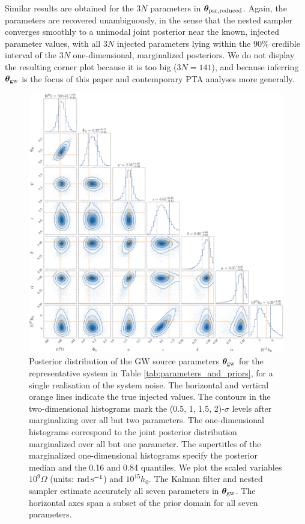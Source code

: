 \documentclass[fleqn,usenatbib,useAMS]{mnras}
\begin{document}
Similar results are obtained for the 3$N$ parameters in $\boldsymbol{\theta}_{\rm psr, reduced}$. Again, the parameters are recovered unambiguously, in the sense that the nested sampler converges smoothly to a unimodal joint posterior near the known, injected parameter values, with all $3N$ injected parameters lying within the 90\% credible interval of the $3N$ one-dimensional, marginalized posteriors. We do not display the resulting corner plot because it is too big ($3N = 141$), and because inferring ${\boldsymbol{\theta}}_{\rm gw}$ is the focus of this paper and contemporary PTA analyses more generally.

 
 
\begin{figure}
	\includegraphics[width=\textwidth, height =\textwidth ]{images/small_h_posterior_10}
	\caption{Posterior distribution of the GW source parameters $\boldsymbol{\theta}_{\rm gw}$ for the representative system in Table \ref{tab:parameters_and_priors}, for a single realisation of the system noise. The horizontal and vertical orange lines indicate the true injected values. The contours in the two-dimensional histograms mark the (0.5, 1, 1.5, 2)-$\sigma$ levels after marginalizing over all but two parameters. The one-dimensional histograms correspond to the joint posterior distribution marginalized over all but one parameter. The supertitles of the marginalized one-dimensional histograms specify the posterior median and the 0.16 and 0.84 quantiles. We plot the scaled variables $10^9 \Omega$ (units: ${\rm rad \, s^{-1}}$) and $10^{15} h_0$. The Kalman filter and nested sampler estimate accurately all seven parameters in ${\boldsymbol{\theta}}_{\rm gw}$. The horizontal axes span a subset of the prior domain for all seven parameters.}
	\label{fig:corner_plot_1}
\end{figure}
\end{document}
